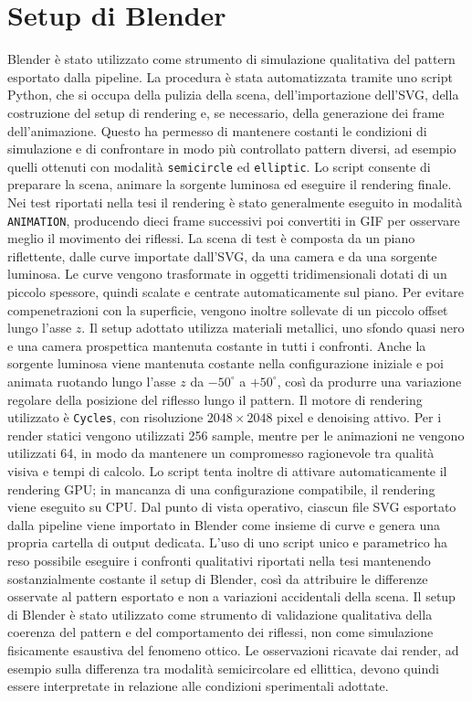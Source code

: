 \documentclass[a4paper,11pt,titlepage,twoside]{book}
\newcommand{\1}{\mathbf{1}}
\numberwithin{equation}{chapter}
\theoremstyle{plain}
\theoremstyle{definition}
\begin{document}
	\section{Setup di Blender}
	
	Blender è stato utilizzato come strumento di simulazione qualitativa del pattern esportato dalla pipeline. La procedura è stata automatizzata tramite uno script Python, che si occupa della pulizia della scena, dell’importazione dell’SVG, della costruzione del setup di rendering e, se necessario, della generazione dei frame dell’animazione. Questo ha permesso di mantenere costanti le condizioni di simulazione e di confrontare in modo più controllato pattern diversi, ad esempio quelli ottenuti con modalità \texttt{semicircle} ed \texttt{elliptic}.
	Lo script consente di preparare la scena, animare la sorgente luminosa ed eseguire il rendering finale. Nei test riportati nella tesi il rendering è stato generalmente eseguito in modalità \texttt{ANIMATION}, producendo dieci frame successivi poi convertiti in GIF per osservare meglio il movimento dei riflessi.
	La scena di test è composta da un piano riflettente, dalle curve importate dall’SVG, da una camera e da una sorgente luminosa. Le curve vengono trasformate in oggetti tridimensionali dotati di un piccolo spessore, quindi scalate e centrate automaticamente sul piano. Per evitare compenetrazioni con la superficie, vengono inoltre sollevate di un piccolo offset lungo l’asse \(z\).
	Il setup adottato utilizza materiali metallici, uno sfondo quasi nero e una camera prospettica mantenuta costante in tutti i confronti. Anche la sorgente luminosa viene mantenuta costante nella configurazione iniziale e poi animata ruotando lungo l’asse \(z\) da \(-50^\circ\) a \(+50^\circ\), così da produrre una variazione regolare della posizione del riflesso lungo il pattern.
	Il motore di rendering utilizzato è \texttt{Cycles}, con risoluzione \(2048 \times 2048\) pixel e denoising attivo. Per i render statici vengono utilizzati 256 sample, mentre per le animazioni ne vengono utilizzati 64, in modo da mantenere un compromesso ragionevole tra qualità visiva e tempi di calcolo. Lo script tenta inoltre di attivare automaticamente il rendering GPU; in mancanza di una configurazione compatibile, il rendering viene eseguito su CPU.
	Dal punto di vista operativo, ciascun file SVG esportato dalla pipeline viene importato in Blender come insieme di curve e genera una propria cartella di output dedicata. L’uso di uno script unico e parametrico ha reso possibile eseguire i confronti qualitativi riportati nella tesi mantenendo sostanzialmente costante il setup di Blender, così da attribuire le differenze osservate al pattern esportato e non a variazioni accidentali della scena.
	Il setup di Blender è stato utilizzato come strumento di validazione qualitativa della coerenza del pattern e del comportamento dei riflessi, non come simulazione fisicamente esaustiva del fenomeno ottico. Le osservazioni ricavate dai render, ad esempio sulla differenza tra modalità semicircolare ed ellittica, devono quindi essere interpretate in relazione alle condizioni sperimentali adottate.
	
\end{document}
